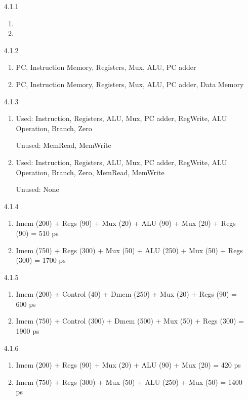 \documentclass[12pt,letterpaper]{article}
\begin{document}
\begin{enumerate}
    \item[4.1.1]
        \begin{enumerate}
            \item
            \item
        \end{enumerate}
    \item[4.1.2]
        \begin{enumerate}
            \item PC, Instruction Memory, Registers, Mux, ALU, PC adder
            \item PC, Instruction Memory, Registers, Mux, ALU, PC adder, Data Memory
        \end{enumerate}
    \item[4.1.3]
        \begin{enumerate}
            \item Used: Instruction, Registers, ALU, Mux, PC adder, RegWrite, ALU Operation, Branch, Zero

                Unused: MemRead, MemWrite
            \item Used: Instruction, Registers, ALU, Mux, PC adder, RegWrite, ALU Operation, Branch, Zero, MemRead, MemWrite

                Unused: None
        \end{enumerate}
    \item[4.1.4]
        \begin{enumerate}
            \item Imem (200) + Regs (90) + Mux (20) + ALU (90) + Mux (20) + Regs (90) = 510 ps
            \item Imem (750) + Regs (300) + Mux (50) + ALU (250) + Mux (50) + Regs (300) = 1700 ps
        \end{enumerate}
    \item[4.1.5]
        \begin{enumerate}
            \item Imem (200) + Control (40) + Dmem (250) + Mux (20) + Regs (90) = 600 ps
            \item Imem (750) + Control (300) + Dmem (500) + Mux (50) + Regs (300) = 1900 ps
        \end{enumerate}
    \item[4.1.6]
        \begin{enumerate}
            \item Imem (200) + Regs (90) + Mux (20) + ALU (90) + Mux (20) = 420 ps
            \item Imem (750) + Regs (300) + Mux (50) + ALU (250) + Mux (50) = 1400 ps
        \end{enumerate}
\end{enumerate}
\end{document}

